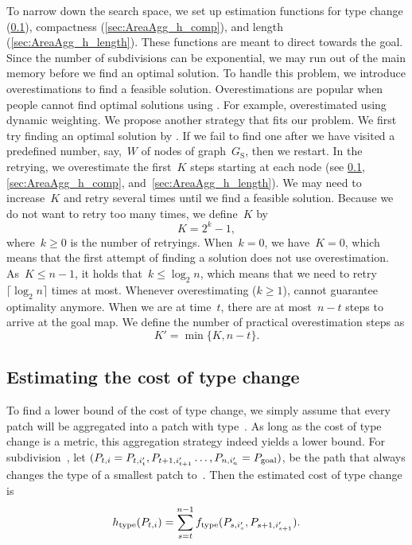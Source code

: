 \documentclass[acmsmall,natbib=false]{acmart}
\begin{document}
To narrow down the search space, 
we set up estimation functions 
for type change (\sect\ref{sec:AreaAgg_h_type}), 
compactness (\sect\ref{sec:AreaAgg_h_comp}), 
and length (\sect\ref{sec:AreaAgg_h_length}). 
These functions are meant to direct \Astar towards the goal.
Since the number of subdivisions can be exponential, 
we may run out of the main memory 
before we find an optimal solution. 
To handle this problem, we introduce overestimations 
to find a feasible solution. 
Overestimations are popular 
when people cannot find optimal solutions using \Astar. 
For example, \textcite{Pohl1973} overestimated 
using dynamic weighting. 
We propose another strategy that fits our problem. 
We first try finding an optimal solution by \Astar. 
If we fail to find one after 
we have visited a predefined number, 
say,~$W$ of nodes of graph~$G_\mathrm{S}$,
then we restart.
In the retrying, we overestimate the first~$K$ steps 
starting at each node
(see \sects\ref{sec:AreaAgg_h_type}, \ref{sec:AreaAgg_h_comp},
and~\ref{sec:AreaAgg_h_length}).
We may need to increase~$K$ and retry several times 
until we find a feasible solution.
Because we do not want to retry too many times,
we define~$K$ by
\begin{equation}
\label{eq:OverestimateK}
K= 2^k -1,
\end{equation}
where~$k\ge 0$ is the number of retryings.
When~$k = 0$, we have~$K=0$,
which means that the first attempt of finding a solution
does not use overestimation.
As~$K\le n-1$, it holds that~$k \le \log_2 n$, 
which means that we need to 
retry~$\lceil \log_2 n\rceil$ times at most.
Whenever overestimating ($k\geq1$), 
\Astar cannot guarantee optimality anymore.
When we are at time~$t$, there are at most~$n-t$ steps 
to arrive at the goal map.
We define the number of practical overestimation steps as
\begin{equation}
\label{eq:OverestimateKPrime}
K'= \min \{K, n-t\}.
\end{equation}



\subsection{Estimating the cost of type change}
\label{sec:AreaAgg_h_type}

To find a lower bound of the cost of type change, 
we simply assume that 
every patch will be aggregated into a patch with type~\Tgoal.
As long as the cost of type change is a metric, this aggregation 
strategy indeed yields a lower bound.
%
For subdivision~\Pnode, let
$(P_{t,i}=P_{t,i'_t}, P_{t+1,i'_{t+1}} \dots,P_{n,i'_n}=P_\mathrm{goal})$,
be the path that always changes the type of a smallest patch 
to~\Tgoal.
Then the estimated cost of type change is
\begin{equation}
\label{eq:h_type}
h_\mathrm{type}(P_{t,i})=
\sum_{s=t}^{n-1}f_\mathrm{type}(P_{s,i'_s},P_{s+1,i'_{s+1}}).
\end{equation}
\end{document}
